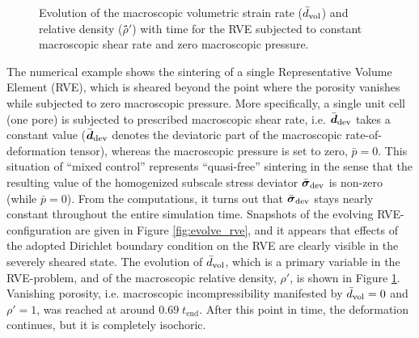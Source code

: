 \documentclass[11pt,a4paper]{article}
\begin{document}
%
\begin{figure}[thpb!]
  \centering
  \caption{Evolution of the macroscopic volumetric strain rate ($\bar{d}_{\mathrm{vol}}$) and relative density ($\rhö́'$) with time for the RVE subjected to constant macroscopic shear rate and zero macroscopic pressure.}
  \label{fig:evolve_graph}
\end{figure}

The numerical example shows the sintering of a single Representative Volume Element (RVE), which is sheared beyond the point where the porosity vanishes while subjected to zero macroscopic pressure.
More specifically, a single unit cell (one pore) is subjected to prescribed macroscopic shear rate, i.e. $\bar{\boldsymbol{d}}_{\mathrm{dev}}$ takes a constant value ($\bar{\boldsymbol{d}}_{\mathrm{dev}}$ denotes the deviatoric part of the macroscopic rate-of-deformation tensor), whereas the macroscopic pressure is set to zero, $\bar{p}=0$. This situation of ``mixed control'' represents ``quasi-free'' sintering in the sense that the resulting value of the homogenized subscale stress deviator $\bar{\boldsymbol{\sigma}}_{\mathrm{dev}}$ is non-zero (while $\bar p = 0 $).
From the computations, it turns out that $\bar{\boldsymbol{\sigma}}_{\mathrm{dev}}$ stays nearly constant throughout the entire simulation time.
Snapshots of the evolving RVE-configuration are given in Figure \ref{fig:evolve_rve}, and it appears that effects of the adopted Dirichlet boundary condition on the RVE are clearly visible in the severely sheared state.
The evolution of $\bar d_{\mathrm{vol}}$, which is a primary variable in the RVE-problem, and of the macroscopic relative density, $\rho'$, is shown in Figure \ref{fig:evolve_graph}.
Vanishing porosity, i.e. macroscopic incompressibility manifested by $\bar d_{\mathrm{vol}} = 0$ and $\rho' = 1$, was reached at around $0.69\;t_{\mathrm{end}}$.
After this point in time, the deformation continues, but it is completely isochoric.
\end{document}
